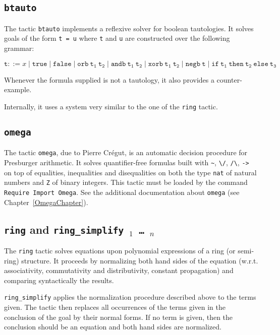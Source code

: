\begin{coq_example*}
\subsection{\tt btauto}
\label{btauto}

The tactic \texttt{btauto} implements a reflexive solver for boolean tautologies. It
solves goals of the form {\tt t = u} where {\tt t} and {\tt u} are constructed
over the following grammar:

$$\mathtt{t} ::= x \mid \mathtt{true} \mid \mathtt{false}\mid \mathtt{orb\ t_1\ t_2}
\mid \mathtt{andb\ t_1\ t_2} \mid\mathtt{xorb\ t_1\ t_2} \mid\mathtt{negb\ t}
\mid\mathtt{if\ t_1\ then\ t_2\ else\ t_3}
$$

Whenever the formula supplied is not a tautology, it also provides a counter-example.

Internally, it uses a system very similar to the one of the {\tt ring} tactic.

\subsection{\tt omega}
\label{omega}

The tactic \texttt{omega}, due to Pierre Cr{\'e}gut,
is an automatic decision procedure for Presburger
arithmetic. It solves quantifier-free
formulas built with \verb|~|, \verb|\/|, \verb|/\|,
\verb|->| on top of equalities, inequalities and disequalities on
both the type \texttt{nat} of natural numbers and \texttt{Z} of binary
integers. This tactic must be loaded by the command \texttt{Require Import
  Omega}. See the additional documentation about \texttt{omega}
(see Chapter~\ref{OmegaChapter}).

\subsection{{\tt ring} and \tt ring\_simplify \term$_1$ \mbox{\dots} \term$_n$}

The {\tt ring} tactic solves equations upon polynomial expressions of
a ring (or semi-ring) structure. It proceeds by normalizing both hand
sides of the equation (w.r.t. associativity, commutativity and
distributivity, constant propagation) and comparing syntactically the
results.

{\tt ring\_simplify} applies the normalization procedure described
above to the terms given. The tactic then replaces all occurrences of
the terms given in the conclusion of the goal by their normal
forms. If no term is given, then the conclusion should be an equation
and both hand sides are normalized.


\end{coq_example*}
